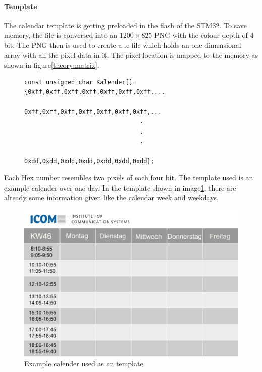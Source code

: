 \paragraph{Template}
The calendar template is getting preloaded in the flash of the STM32. To save memory, the file is converted into an $1200 \times 825$ PNG with the colour depth of 4 bit. The PNG then is used to create a .c file which holds an one dimensional array with all the pixel data in it. The pixel location is mapped to the memory as shown in figure\ref{theory:matrix}. 

\begin{figure}[H]
	\begin{lstlisting}
const unsigned char Kalender[]={0xff,0xff,0xff,0xff,0xff,0xff,0xff,...
								0xff,0xff,0xff,0xff,0xff,0xff,0xff,...
								.
								.
								.
								0xdd,0xdd,0xdd,0xdd,0xdd,0xdd,0xdd};
	\end{lstlisting}
\end{figure}
Each Hex number resembles two pixels of each four bit. The template used is an example calender over one day. In the template shown in image\ref{software:kalender}, there are already some information given like the calendar week and weekdays.
\begin{figure}[H]
	\centering
	\includegraphics[height=0.6\textwidth]{4-development/software/graphics/Kalender.png}
	\caption{Example calender used as an template\label{software:kalender}}
\end{figure}


